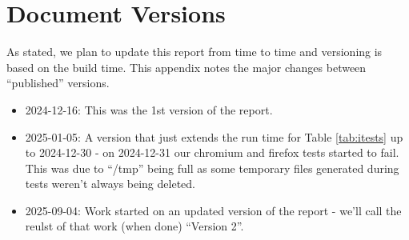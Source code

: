 \section{Document Versions}
\label{app:versions}

As stated, we plan to update this report from time to time and versioning
is based on the build time. This appendix notes the major changes between
``published'' versions.

\begin{itemize}

\item 2024-12-16: This was the 1st version of the report.

\item 2025-01-05: A version that just extends the run time for Table
    \ref{tab:itests} up to 2024-12-30 - on 2024-12-31 our chromium and firefox
        tests started to fail. This was due to ``/tmp'' being full as some
        temporary files generated during tests weren't always being deleted.

\item 2025-09-04: Work started on an updated version of the report - we'll call
    the reulst of that work (when done) ``Version 2''.

\end{itemize}
